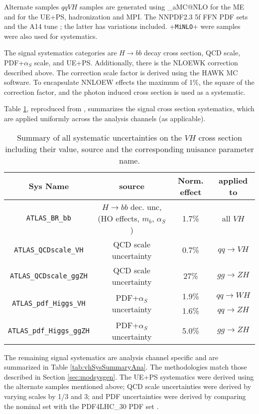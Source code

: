 Alternate samples $qqVH$ samples are generated using \mg\_aMC@NLO \cite{mg5amc} for the ME and  for the UE+PS, hadronization and MPI.  The NNPDF2.3 5f FFN PDF sets and the A14 tune \cite{a14tune}; the latter has variations included.  \powheg+\texttt{MiNLO}+ were samples were also used for systematics.

The signal systematics categories are $H\to bb$ decay cross section, QCD scale, PDF+$\alpha_S$ scale, and UE+PS.  Additionally, there is the NLOEWK correction described above.  The correction scale factor is derived using the HAWK MC software.  To encapsulate NNLOEW effects the maximum of 1\%, the square of the correction factor, and the photon induced cross section is used as a systematic. 
 
Table \ref{tab:vhSysTheorySummary}, reproduced from \cite{modelingnote}, summarizes the signal cross section systematics, which are applied uniformly across the analysis channels (as applicable).

\begin{table}[!htbp]\captionsetup{justification=centering}
\caption{Summary of all systematic uncertainties on the $VH$ cross section including their value, source and the corresponding nuisance parameter name.}
\footnotesize
\centering
\begin{tabular}{ c || c | c | c  }
\hline
\hline
Sys Name  & source & Norm. effect & applied to \\
\hline
\texttt{ATLAS\_BR\_bb} 			&  $H\to bb$ dec. unc, (HO effects, $m_b$, $\alpha_S$)	&  1.7\% 	& all $VH$ \\
\hline	
\texttt{ATLAS\_QCDscale\_VH}		& QCD scale uncertainty									&  0.7\%	& $qq\to VH$ \\
\hline
\texttt{ATLAS\_QCDscale\_ggZH}	& QCD scale uncertainty									&  27\%	  & $gg\to ZH$			\\
\hline
\multirow{2}{*}{\texttt{ATLAS\_pdf\_Higgs\_VH}}  & \multirow{2}{*}{PDF+$\alpha_S$ uncertainty}                  &  1.9\%    & $qq\to WH$                  \\
									  &											 &  1.6\%    &  $qq\to ZH$                  \\   
\hline
\texttt{ATLAS\_pdf\_Higgs\_ggZH}    &  PDF+$\alpha_S$ uncertainty								&    5.0\%   & $gg\to ZH$			\\
\hline
\hline
\end{tabular}
\label{tab:vhSysTheorySummary}
\end{table}

The remaining signal systematics are analysis channel specific and are summarized in Table \ref{tab:vhSysSummaryAna}.  The methodologies match those described in Section \ref{sec:modsysgen}.  The UE+PS systematics were derived using the alternate samples mentioned above; QCD scale uncertainties were derived by varying scales by 1/3 and 3; and PDF uncertainties were derived by comparing the nominal set with the PDF4\-LHC\-\_30 PDF set \cite{pdf4lhc}.


